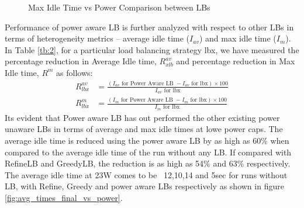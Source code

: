 \begin{figure}
\centering
\caption{Max Idle Time vs Power Comparison between LBs}
\label{fig:idle_times_final_vs_power}
\end{figure}


Performance of power aware LB is further analyzed with respect to other LBs in
terms of heterogeneity metrics – average idle time ($I_{av}$) and max idle time ($I_{m}$).
In Table \ref{tb:2}, for a particular load  balancing strategy lbx, we have measured the percentage reduction in Average Idle time, $R^{av}_{xlb}$ and
percentage reduction in Max Idle time, $R^{m}$ as follows:
\begin{equation} \label{eq:3}
\begin{aligned}
   R^{av}_{lbx} &= \frac{(I_{av} \text{ for Power Aware LB } - I_{av} \text{ for lbx}) \times 100}{I_{av} \text{ for lbx}}  \\
   R^{m}_{lbx}  &= \frac{(I_{m}  \text{ for Power Aware LB } - I_{m}  \text{ for lbx}) \times 100}{I_{m}  \text{ for lbx}}  
\end{aligned}
    \end{equation}
Its evident that Power aware LB has out performed the other existing power
unaware LBs in terms of average and max idle times at lowe power caps. The average idle time is
reduced using the power aware LB by as high as 60\% when compared to the
average idle time of the run without any LB. If compared with RefineLB and
GreedyLB, the reduction is as high as 54\% and 63\% respectively. The average
idle time at 23W comes to be ~12,10,14 and 5sec for runs without LB, with
Refine, Greedy and power aware LBs respectively as shown in figure
\ref{fig:avg_times_final_vs_power}.

